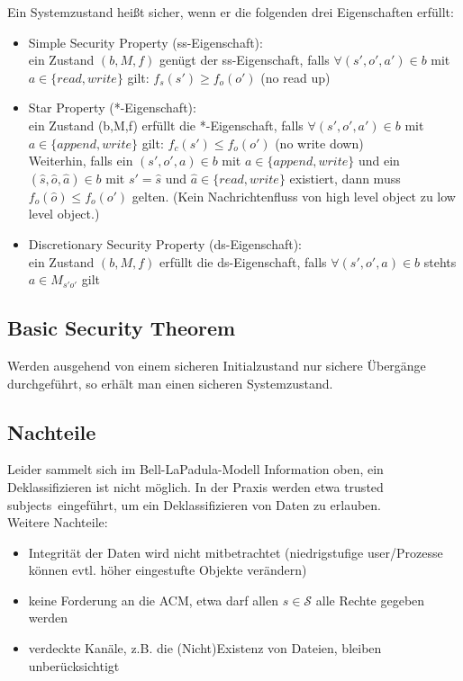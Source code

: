 \documentclass[a4paper,twoside,DIV15,BCOR12mm]{scrbook}
\begin{document}
Ein Systemzustand heißt sicher, wenn er die folgenden drei Eigenschaften erfüllt:

\begin{itemize}
	\item Simple Security Property (ss-Eigenschaft):\\ ein Zustand $(b,M,f)$ genügt der ss-Eigenschaft, falls $\forall (s',o',a') \in b$ mit $a \in \{read, write\}$ gilt: $f_s(s') \geq f_o(o')$ (\glqq no read up\grqq)
	\item Star Property (*-Eigenschaft):\\ ein Zustand (b,M,f) erfüllt die *-Eigenschaft, falls $\forall (s',o',a') \in b$ mit $a \in \{append, write\}$ gilt: $f_c(s') \leq f_o(o')$ (\glqq no write down\grqq)\\ Weiterhin, falls ein $(s', o',a) \in b$ mit $a \in \{append, write\}$ und ein $(\hat s, \hat o, \hat a) \in b$ mit $s' = \hat s$ und $\hat a \in \{read, write\}$ existiert, dann muss $f_o(\hat o) \leq f_o(o')$ gelten. (\glqq Kein Nachrichtenfluss von high level object zu low level object.\grqq)
	\item Discretionary Security Property (ds-Eigenschaft):\\ ein Zustand $(b,M,f)$ erfüllt die ds-Eigenschaft, falls $\forall (s',o',a) \in b$ stehts $a \in M_{s'o'}$ gilt
\end{itemize}

\subsection{Basic Security Theorem}

Werden ausgehend von einem sicheren Initialzustand nur sichere Übergänge durchgeführt, so erhält man einen sicheren Systemzustand.

\subsection{Nachteile}

Leider sammelt sich im Bell-LaPadula-Modell Information \glqq oben\grqq, ein Deklassifizieren ist nicht möglich. In der Praxis werden etwa \glqq trusted subjects\grqq\ eingeführt, um ein Deklassifizieren von Daten zu erlauben.\\

Weitere Nachteile:

\begin{itemize}
	\item Integrität der Daten wird nicht mitbetrachtet (niedrigstufige user/Prozesse können evtl. höher eingestufte Objekte verändern)
	\item keine Forderung an die ACM, etwa darf allen $s \in \mathcal{S}$ alle Rechte gegeben werden
	\item verdeckte Kanäle, z.B. die (Nicht)Existenz von Dateien, bleiben unberücksichtigt
\end{itemize}
\end{document}
